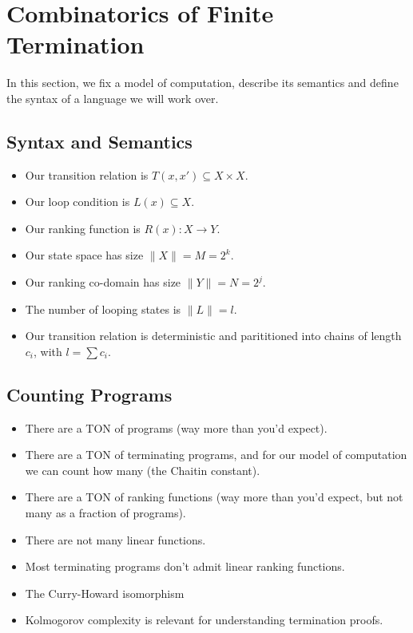\documentclass[preprint]{sigplanconf}
\theoremstyle{definition}
\begin{document}
\section{Combinatorics of Finite Termination}
In this section, we fix a model of computation, describe its semantics and
define the syntax of a language we will work over.

\subsection{Syntax and Semantics}

\begin{itemize}
 \item Our transition relation is $T(x, x') \subseteq X \times X$.
 \item Our loop condition is $L(x) \subseteq X$.
 \item Our ranking function is $R(x) : X \to Y$.
 \item Our state space has size $\| X \| = M = 2^k$.
 \item Our ranking co-domain has size $\| Y \| = N = 2^j$.
 \item The number of looping states is $\| L \| = l$.
 \item Our transition relation is deterministic and parititioned into chains of length $c_i$, with $l = \sum c_i$.
\end{itemize}

\subsection{Counting Programs}
\begin{itemize}
 \item There are a TON of programs (way more than you'd expect).
 \item There are a TON of terminating programs, and for our model of computation we can count
  how many (the Chaitin constant).
 \item There are a TON of ranking functions (way more than you'd expect, but not many as a
  fraction of programs).
 \item There are not many linear functions.
 \item Most terminating programs don't admit linear ranking functions.
 \item The Curry-Howard isomorphism
 \item Kolmogorov complexity is relevant for understanding termination proofs.
\end{itemize}
\end{document}
